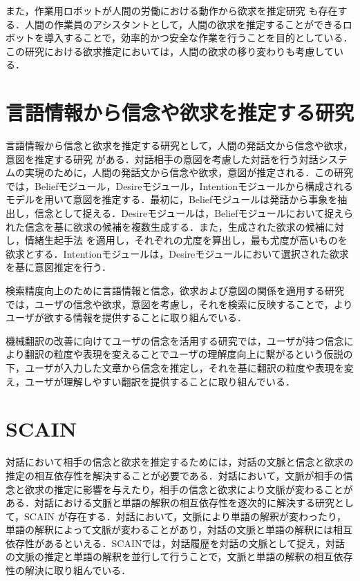 \par
また，作業用ロボットが人間の労働における動作から欲求を推定研究 \cite{inbook}も存在する．人間の作業員のアシスタントとして，人間の欲求を推定することができるロボットを導入することで，効率的かつ安全な作業を行うことを目的としている．この研究における欲求推定においては，人間の欲求の移り変わりも考慮している．

\section{言語情報から信念や欲求を推定する研究}
\par
言語情報から信念と欲求を推定する研究として，人間の発話文から信念や欲求，意図を推定する研究 \cite{高橋拓誠2015bdi}がある．対話相手の意図を考慮した対話を行う対話システムの実現のために，人間の発話文から信念や欲求，意図が推定される．この研究では，Beliefモジュール，Desireモジュール，Intentionモジュールから構成されるモデルを用いて意図を推定する．最初に，Beliefモジュールは発話から事象を抽出し，信念として捉える．Desireモジュールは，Beliefモジュールにおいて捉えられた信念を基に欲求の候補を複数生成する．また，生成された欲求の候補に対し，情緒生起手法 \cite{2002}を適用し，それぞれの尤度を算出し，最も尤度が高いものを欲求とする．Intentionモジュールは，Desireモジュールにおいて選択された欲求を基に意図推定を行う．

\par
検索精度向上のために言語情報と信念，欲求および意図の関係を適用する研究 \cite{10.1007/978-3-642-02481-8_4}では，ユーザの信念や欲求，意図を考慮し，それを検索に反映することで，よりユーザが欲する情報を提供することに取り組んでいる．

\par
機械翻訳の改善に向けてユーザの信念を活用する研究\cite{farwell1997user}では，ユーザが持つ信念により翻訳の粒度や表現を変えることでユーザの理解度向上に繋がるという仮説の下，ユーザが入力した文章から信念を推定し，それを基に翻訳の粒度や表現を変え，ユーザが理解しやすい翻訳を提供することに取り組んでいる．

\section{SCAIN}
対話において相手の信念と欲求を推定するためには，対話の文脈と信念と欲求の推定の相互依存性を解決することが必要である．対話において，文脈が相手の信念と欲求の推定に影響を与えたり，相手の信念と欲求により文脈が変わることがある．対話における文脈と単語の解釈の相互依存性を逐次的に解決する研究として，SCAIN \cite{takimoto2020slaminspired}が存在する．対話において，文脈により単語の解釈が変わったり，単語の解釈によって文脈が変わることがあり，対話の文脈と単語の解釈には相互依存性があるといえる．SCAINでは，対話履歴を対話の文脈として捉え，対話の文脈の推定と単語の解釈を並行して行うことで，文脈と単語の解釈の相互依存性の解決に取り組んでいる．

